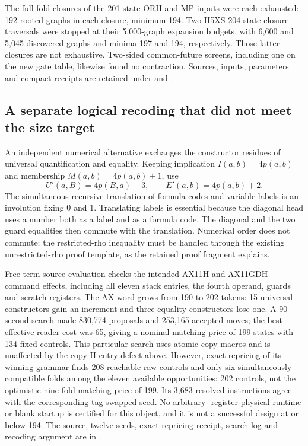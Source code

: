 \documentclass[10pt,a4paper]{article}
\theoremstyle{definition}
\begin{document}
The full fold closures of the 201-state ORH and MP inputs were each
exhausted: 192 rooted graphs in each closure, minimum 194. Two H5XS
204-state closure traversals were stopped at their 5,000-graph expansion
budgets, with 6,600 and 5,045 discovered graphs and minima 197 and 194,
respectively. Those latter closures are not exhaustive. Two-sided
common-future screens, including one on the new gate table, likewise
found no contraction. Sources, inputs, parameters and compact receipts
are retained under  and
.

\subsection{A separate logical recoding that did not meet the size target}

An independent numerical alternative exchanges the constructor residues
of universal quantification and equality. Keeping implication
$I(a,b)=4p(a,b)$ and membership $M(a,b)=4p(a,b)+1$, use
\[
              U'(a,B)=4p(B,a)+3,\qquad E'(a,b)=4p(a,b)+2.
\]
The simultaneous recursive translation of formula codes and variable
labels is an involution fixing 0 and 1. Translating labels is essential
because the diagonal head uses a number both as a label and as a formula
code. The diagonal and the two guard equalities then commute with the
translation. Numerical order does not commute; the restricted-rho
inequality must be handled through the existing unrestricted-rho proof
template, as the retained proof fragment explains.

Free-term source evaluation checks the intended AX11H and AX11GDH
command effects, including all eleven stack entries, the fourth operand,
guards and scratch registers. The AX word grows from 190 to 202 tokens:
15 universal constructors gain an increment and three equality
constructors lose one. A 90-second search made 830,774 proposals and
253,165 accepted moves; the best effective reader cost was 65, giving
a nominal matching price of 199 states with 134 fixed controls. This
particular search uses atomic copy macros and is unaffected by the
copy-H-entry defect above. However, exact repricing of its winning
grammar finds 208 reachable raw controls and only six simultaneously
compatible folds among the eleven available opportunities: 202 controls,
not the optimistic nine-fold matching price of 199. Its 3,683 resolved
instructions agree with the corresponding tag-swapped seed. No arbitrary-
register physical runtime or blank startup is certified for this object,
and it is not a successful design at or below 194. The source, twelve
seeds, exact repricing receipt, search log and recoding argument are in
.
\end{document}
